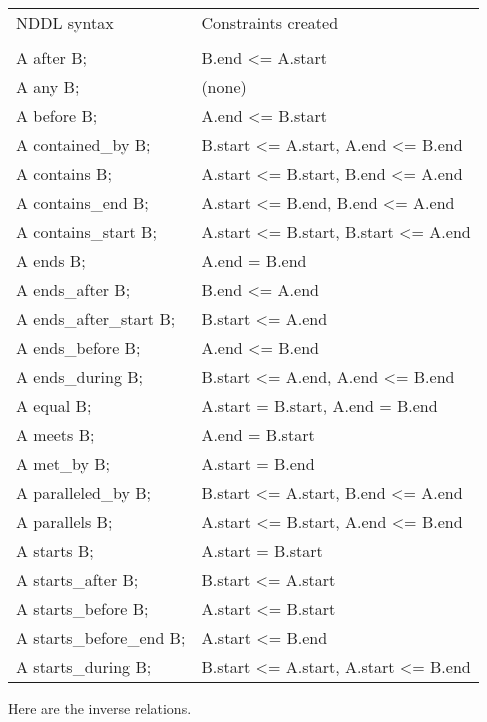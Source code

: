 \documentclass[10pt, letterpaper, twoside]{article}
\begin{document}
\begin{tabular}{ll}
NDDL syntax & Constraints created \\
\cline{1-2} \\
A after B; & B.end <= A.start \\
A any B; & (none) \\
A before B; & A.end <= B.start \\
A contained\_by B; & B.start <= A.start, A.end <= B.end \\
A contains B; & A.start <= B.start, B.end <= A.end \\
A contains\_end B; & A.start <= B.end, B.end <= A.end \\
A contains\_start B; & A.start <= B.start, B.start <= A.end \\
A ends B; & A.end = B.end \\
A ends\_after B; & B.end <= A.end \\
A ends\_after\_start B; & B.start <= A.end \\
A ends\_before B; & A.end <= B.end \\
A ends\_during B; & B.start <= A.end, A.end <= B.end \\
A equal B; & A.start = B.start, A.end = B.end \\
A meets B; & A.end = B.start \\
A met\_by B; & A.start = B.end \\
A paralleled\_by B; & B.start <= A.start, B.end <= A.end \\
A parallels B; & A.start <= B.start, A.end <= B.end \\
A starts B; & A.start = B.start \\
A starts\_after B; & B.start <= A.start \\
A starts\_before B; & A.start <= B.start \\
A starts\_before\_end B; & A.start <= B.end \\
A starts\_during B; & B.start <= A.start, A.start <= B.end \\
\end{tabular}

Here are the inverse relations.
\end{document}
